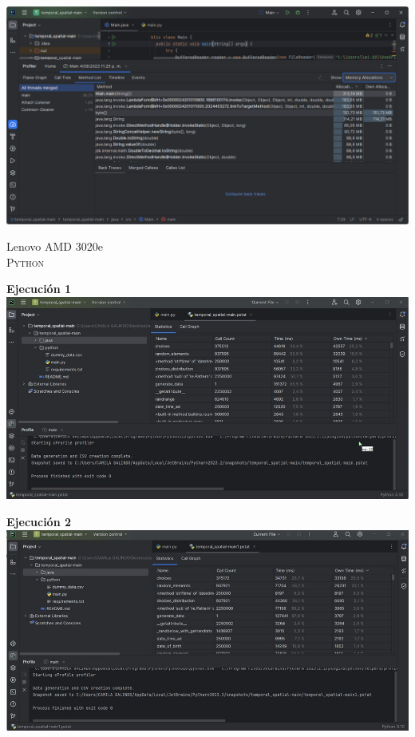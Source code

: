 \documentclass[a4paper,twocolumn,10pt]{article}
\begin{document}
\includegraphics[width=0.9\linewidth]{HP Ryzen 5500U/Method List Memory Allocation 3.png}\\

\maketitle Lenovo AMD 3020e\\

\textsc{Python}

\textbf{Ejecución 1\\}
\includegraphics[width=0.9\linewidth]{Lenovo AMD 3020e/Prueba python 1.jpeg}

\textbf{Ejecución 2\\}
\includegraphics[width=0.9\linewidth]{Lenovo AMD 3020e/Prueba python 2.jpeg}
\end{document}
